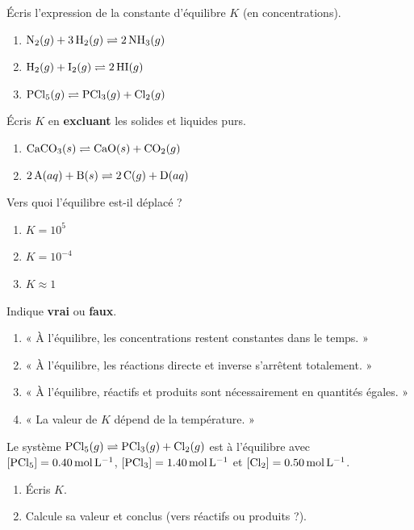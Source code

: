 \documentclass[11pt,a4paper]{article}
\begin{document}
\begin{exo}
Écris l'expression de la constante d'équilibre $K$ (en concentrations).
\begin{enumerate}[label=\alph*)]
  \item $\ce{N2}(g) + 3\,\ce{H2}(g) \rightleftharpoons 2\,\ce{NH3}(g)$
  \item $\ce{H2}(g) + \ce{I2}(g) \rightleftharpoons 2\,\ce{HI}(g)$
  \item $\ce{PCl5}(g) \rightleftharpoons \ce{PCl3}(g) + \ce{Cl2}(g)$
\end{enumerate}
\end{exo}

\begin{exo}
Écris $K$ en \textbf{excluant} les solides et liquides purs.
\begin{enumerate}[label=\alph*)]
  \item $\ce{CaCO3}(s) \rightleftharpoons \ce{CaO}(s) + \ce{CO2}(g)$
  \item $2\,\ce{A}(aq) + \ce{B}(s) \rightleftharpoons 2\,\ce{C}(g) + \ce{D}(aq)$
\end{enumerate}
\end{exo}

\begin{exo}
Vers quoi l'équilibre est-il déplacé ?
\begin{enumerate}[label=\alph*)]
  \item $K = 10^{5}$
  \item $K = 10^{-4}$
  \item $K \approx 1$
\end{enumerate}
\end{exo}

\begin{exo}
Indique \textbf{vrai} ou \textbf{faux}.
\begin{enumerate}[label=\alph*)]
  \item « À l'équilibre, les concentrations restent constantes dans le temps. »
  \item « À l'équilibre, les réactions directe et inverse s'arrêtent totalement. »
  \item « À l'équilibre, réactifs et produits sont nécessairement en quantités égales. »
  \item « La valeur de $K$ dépend de la température. »
\end{enumerate}
\end{exo}

\begin{exo}
Le système $\ce{PCl5}(g) \rightleftharpoons \ce{PCl3}(g) + \ce{Cl2}(g)$ est à l'équilibre avec $[\ce{PCl5}]=\qty{0.40}{\mol\per\litre}$, $[\ce{PCl3}]=\qty{1.40}{\mol\per\litre}$ et $[\ce{Cl2}]=\qty{0.50}{\mol\per\litre}$.
\begin{enumerate}[label=\alph*)]
  \item Écris $K$.
  \item Calcule sa valeur et conclus (vers réactifs ou produits ?).
\end{enumerate}
\end{exo}
\end{document}
